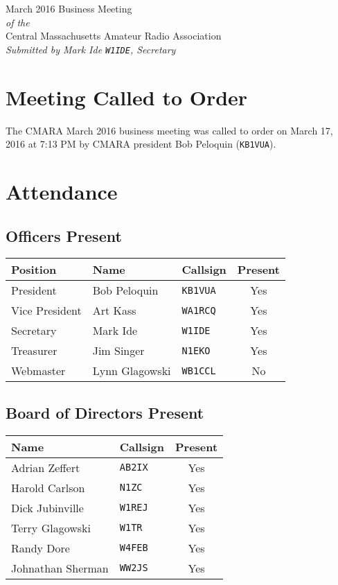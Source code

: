 \documentclass[10pt,letterpaper]{article}
\begin{document}
\begin{center}
{\huge March 2016 Business Meeting}\\
\emph{of the}\\
{\Large Central Massachusetts Amateur Radio Association}\\
\emph{Submitted by Mark Ide \texttt{W1IDE}, Secretary}
\end{center}

\section{Meeting Called to Order}
The CMARA March 2016 business meeting was called to order on March 17, 2016 at 7:13 PM by CMARA president Bob Peloquin (\texttt{KB1VUA}).

\section{Attendance}

\subsection{Officers Present}

\begin{tabular}{|l|l|l|c|}
  \hline
  \textbf{Position} & \textbf{Name}  & \textbf{Callsign} & \textbf{Present} \\ \hline
  President         & Bob Peloquin   & \texttt{KB1VUA}   & Yes  \\
  Vice President    & Art Kass       & \texttt{WA1RCQ}   & Yes  \\
  Secretary         & Mark Ide       & \texttt{W1IDE}    & Yes  \\
  Treasurer         & Jim Singer     & \texttt{N1EKO}    & Yes  \\
  Webmaster         & Lynn Glagowski & \texttt{WB1CCL}   & No   \\
  \hline
\end{tabular}

\subsection{Board of Directors Present}

\begin{tabular}{|l|l|c|}
  \hline
  \textbf{Name}     & \textbf{Callsign} & \textbf{Present} \\ \hline
  Adrian Zeffert    & \texttt{AB2IX}    & Yes \\
  Harold Carlson    & \texttt{N1ZC}     & Yes \\
  Dick Jubinville   & \texttt{W1REJ}    & Yes \\
  Terry Glagowski   & \texttt{W1TR}     & Yes \\
  Randy Dore        & \texttt{W4FEB}    & Yes \\
  Johnathan Sherman & \texttt{WW2JS}    & Yes \\
  \hline
\end{tabular}
\end{document}
